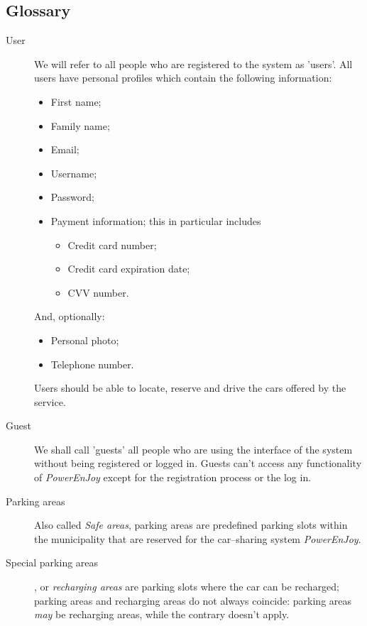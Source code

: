 \documentclass{article}
\begin{document}
		\subsection{Glossary}
			\begin{description}
				\item[User] We will refer to all people who are registered to the system as 'users'. All users have personal profiles which contain the following information:
				\begin{itemize}
					\item First name;
					\item Family name;
					\item Email;
					\item Username;
					\item Password;
					\item Payment information; this in particular includes
						\begin{itemize}
							\item Credit card number;
							\item Credit card expiration date;
							\item CVV number. %
						\end{itemize}
				\end{itemize}
				And, optionally:
				\begin{itemize}		
					\item Personal photo;
					\item Telephone number.
				\end{itemize}
				Users should be able to locate, reserve and drive the cars offered by the service. 
				
				\item[Guest] We shall call 'guests' all people who are using the interface of the system without being registered or logged in. Guests can't access any functionality of \textit{PowerEnJoy} except for the registration process or the log in. 
				
				\item[Parking areas] Also called \textit{Safe areas}, parking areas are predefined parking slots within the municipality that are reserved for the car–sharing system \textit{PowerEnJoy}.
				\item[Special parking areas], or \textit{recharging areas} are parking slots where the car can be recharged; parking areas and recharging areas do not always coincide: parking areas \textit{may} be recharging areas, while the contrary doesn't apply. %
				

\end{description}
\end{document}
